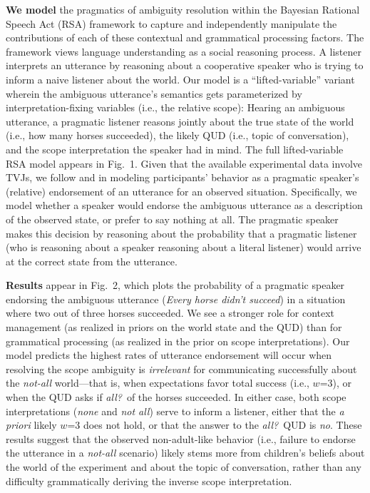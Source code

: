 \documentclass[12pt]{article}
\begin{document}
\textbf{We model} the pragmatics of ambiguity resolution within the Bayesian Rational Speech Act ({{RSA}}) framework \cite{GoodmanFrank2016} to capture and independently manipulate the contributions of each of these contextual and grammatical processing factors. The framework views language understanding as a social reasoning process. A listener interprets an utterance by reasoning about a cooperative speaker who is trying to inform a naive listener about the world. Our model is a ``lifted-variable'' variant wherein the ambiguous utterance's semantics gets parameterized by interpretation-fixing variables (i.e., the relative scope): Hearing an ambiguous utterance, a pragmatic listener reasons jointly about the true state of the world (i.e., how many horses succeeded), the likely QUD (i.e., topic of conversation), and the scope interpretation the speaker had in mind. The full lifted-variable RSA model appears in Fig.~1. Given that the available experimental data involve 
{TVJs,}
we follow  and  in modeling participants' behavior as a pragmatic speaker's (relative) endorsement of an utterance for an observed situation. Specifically, we model whether a speaker would endorse the ambiguous utterance as a description of the observed state, or prefer to say nothing at all. The pragmatic speaker makes this decision by reasoning about the probability that a pragmatic listener (who is reasoning about a speaker reasoning about a literal listener) would arrive at the correct state from the utterance. 

\textbf{Results} appear in Fig.~2, which plots the probability of a pragmatic speaker endorsing the ambiguous utterance (\textit{Every horse didn't succeed}) in a situation where two out of three horses succeeded. We see a stronger role for context management (as realized in priors on the world state and the QUD) than for grammatical processing (as realized in the prior on scope interpretations). Our model predicts the highest rates of utterance endorsement {will} occur when resolving the scope ambiguity is \emph{irrelevant} for communicating successfully about the {\textit{not-all}} world---that is, when expectations favor total success (i.e., $w$=3), or when the QUD asks if \emph{all?}~of the horses succeeded. In either case, both scope interpretations {(\textit{none} and \textit{not all})} serve to inform a listener, either that the \emph{a priori} likely $w$=3 does not hold, or that the answer to the \emph{all?}~QUD is \emph{no}.  These results suggest that the observed non-adult-like behavior (i.e., failure to endorse the utterance in a {\textit{not-all}} scenario) likely stems more from children's beliefs about the world of the experiment and about the topic of conversation, rather than any difficulty grammatically deriving the inverse scope interpretation. 
\end{document}
